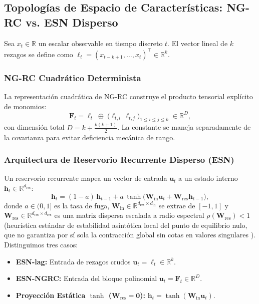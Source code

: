 \documentclass[aip,cha,reprint,amsmath,amssymb]{revtex4-2}
\begin{document}
\subsection{Topologías de Espacio de Características: NG-RC vs. ESN Disperso}

Sea $x_t \in \mathbb{R}$ un escalar observable en tiempo discreto $t$. El vector lineal de $k$ rezagos se define como $\bm{\ell}_t = (x_{t-k+1}, \dots, x_t)^\top \in \mathbb{R}^k$.

\subsubsection{NG-RC Cuadrático Determinista}
La representación cuadrática de NG-RC construye el producto tensorial explícito de monomios:
\begin{equation}
\mathbf{F}_t = \bm{\ell}_t \;\oplus\; \Big( \ell_{t,i} \, \ell_{t,j} \Big)_{1 \le i \le j \le k} \;\in \mathbb{R}^D,
\label{eq:ngrc_state}
\end{equation}
con dimensión total $D = k + \frac{k(k+1)}{2}$. La constante se maneja separadamente de la covarianza para evitar deficiencia mecánica de rango.

\subsubsection{Arquitectura de Reservorio Recurrente Disperso (ESN)}
Un reservorio recurrente mapea un vector de entrada $\mathbf{u}_t$ a un estado interno $\mathbf{h}_t \in \mathbb{R}^{d_{\text{res}}}$:
\begin{equation}
\mathbf{h}_t = (1 - a)\,\mathbf{h}_{t-1} + a\,\tanh\!\Big( \mathbf{W}_{\text{in}} \mathbf{u}_t + \mathbf{W}_{\text{res}} \mathbf{h}_{t-1} \Big),
\label{eq:esn_state}
\end{equation}
donde $a \in (0, 1]$ es la tasa de fuga, $\mathbf{W}_{\text{in}} \in \mathbb{R}^{d_{\text{res}} \times d_{\text{in}}}$ se extrae de $[-1, 1]$ y $\mathbf{W}_{\text{res}} \in \mathbb{R}^{d_{\text{res}} \times d_{\text{res}}}$ es una matriz dispersa escalada a radio espectral $\rho(\mathbf{W}_{\text{res}}) < 1$ (heurística estándar de estabilidad asintótica local del punto de equilibrio nulo, que no garantiza por sí sola la contracción global sin cotas en valores singulares \cite{manjunath2013theory}). Distinguimos tres casos:
\begin{itemize}
    \item \textbf{ESN-lag:} Entrada de rezagos crudos $\mathbf{u}_t = \bm{\ell}_t \in \mathbb{R}^k$.
    \item \textbf{ESN-NGRC:} Entrada del bloque polinomial $\mathbf{u}_t = \mathbf{F}_t \in \mathbb{R}^D$.
    \item \textbf{Proyección Estática $\tanh$ ($\mathbf{W}_{\text{res}} = \mathbf{0}$):} $\mathbf{h}_t = \tanh(\mathbf{W}_{\text{in}} \mathbf{u}_t)$.
\end{itemize}
\end{document}
